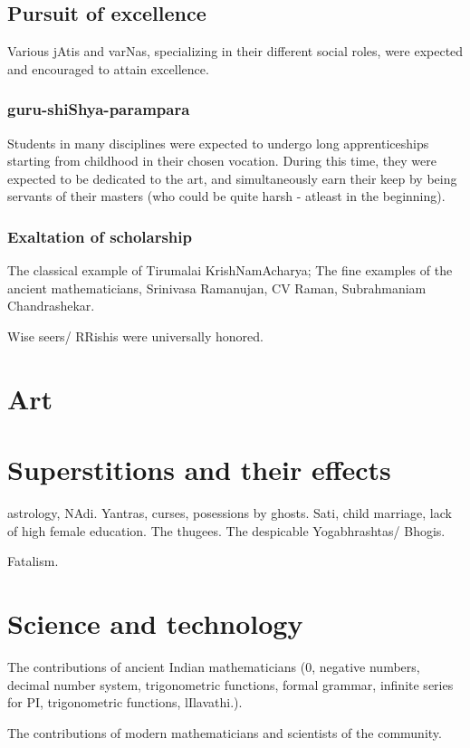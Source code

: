 \documentclass[oneside, article]{memoir}
\begin{document}
\subsection{Pursuit of excellence}
Various jAtis and varNas, specializing in their different social roles, were expected and encouraged to attain excellence.

\subsubsection{guru-shiShya-parampara}
Students in many disciplines were expected to undergo long apprenticeships starting from childhood in their chosen vocation. During this time, they were expected to be dedicated to the art, and simultaneously earn their keep by being servants of their masters (who could be quite harsh - atleast in the beginning).

\subsubsection{Exaltation of scholarship}
The classical example of Tirumalai KrishNamAcharya; The fine examples of the ancient mathematicians, Srinivasa Ramanujan, CV Raman, Subrahmaniam Chandrashekar.

Wise seers/ RRishis were universally honored.

\section{Art}
\section{Superstitions and their effects}
\subitem astrology, NAdi.
\subitem Yantras, curses, posessions by ghosts.
\subitem Sati, child marriage, lack of high female education.
\subitem The thugees.
\subitem The despicable Yogabhrashtas/ Bhogis.

\subitem Fatalism.

\section{Science and technology}
The contributions of ancient Indian mathematicians (0, negative numbers, decimal number system, trigonometric functions, formal grammar, infinite series for PI, trigonometric functions, lIlavathi.).

The contributions of modern mathematicians and scientists of the community.
\end{document}
